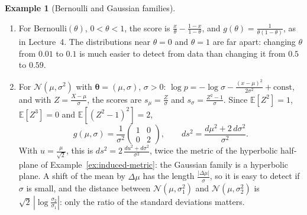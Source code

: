 \documentclass[11pt]{article}
\newcommand{\E}{\mathbb{E}}
\theoremstyle{definition}
\newtheorem{example}[definition]{Example}
\theoremstyle{plain}
\theoremstyle{remark}
\begin{document}
\begin{example}[Bernoulli and Gaussian families]\label{ex:fisher-gaussian}
    \begin{enumerate}
        \item For Bernoulli$(\theta)$, $0 < \theta < 1$, the score is $\frac{x}{\theta} - \frac{1 - x}{1 - \theta}$, and $g(\theta) = \frac{1}{\theta(1 - \theta)}$, as in Lecture~4. The distributions near $\theta = 0$ and $\theta = 1$ are far apart: changing $\theta$ from $0.01$ to $0.1$ is much easier to detect from data than changing it from $0.5$ to $0.59$.
        \item For $\mathcal{N}(\mu, \sigma^2)$ with $\boldsymbol{\theta} = (\mu, \sigma)$, $\sigma > 0$: $\log p = -\log\sigma - \frac{(x - \mu)^2}{2\sigma^2} + \text{const}$, and with $Z = \frac{X - \mu}{\sigma}$, the scores are $s_\mu = \frac{Z}{\sigma}$ and $s_\sigma = \frac{Z^2 - 1}{\sigma}$. Since $\E[Z^2] = 1$, $\E[Z^3] = 0$ and $\E[(Z^2 - 1)^2] = 2$,
        \[g(\mu, \sigma) = \frac{1}{\sigma^2}\begin{pmatrix} 1 & 0 \\ 0 & 2 \end{pmatrix}, \qquad ds^2 = \frac{d\mu^2 + 2\,d\sigma^2}{\sigma^2}.\]
        With $u = \frac{\mu}{\sqrt 2}$, this is $ds^2 = 2\,\frac{du^2 + d\sigma^2}{\sigma^2}$, twice the metric of the hyperbolic half-plane of Example~\ref{ex:induced-metric}: the Gaussian family is a hyperbolic plane. A shift of the mean by $\Delta\mu$ has the length $\frac{|\Delta\mu|}{\sigma}$, so it is easy to detect if $\sigma$ is small, and the distance between $\mathcal{N}(\mu, \sigma_1^2)$ and $\mathcal{N}(\mu, \sigma_2^2)$ is $\sqrt{2}\,|\log\frac{\sigma_2}{\sigma_1}|$: only the ratio of the standard deviations matters.
    \end{enumerate}
\end{example}
\end{document}
